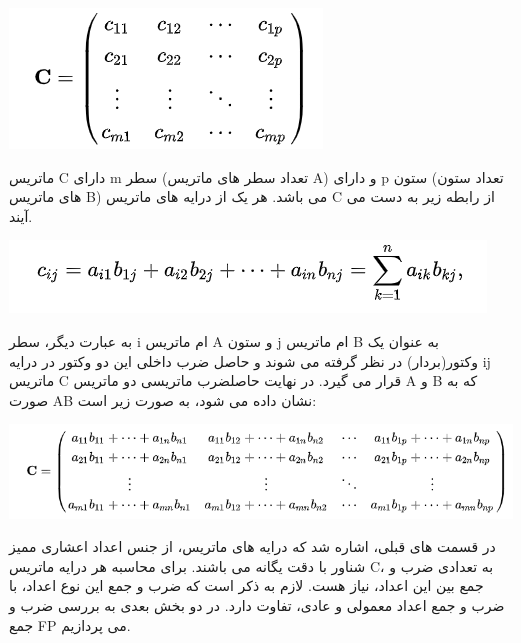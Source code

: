 \documentclass[12pt,titlepage,a4page , tikz , multi,table , svgnames,xcdraw]{article}
\begin{document}
\begin{center}
\includegraphics[scale=0.8]
    {Images/Introduction/mat_mult_2.png}\\
\end{center}

	ماتریس C دارای m سطر (تعداد سطر های ماتریس A) و دارای p  ستون (تعداد ستون های ماتریس B) می باشد. هر یک از درایه های ماتریس C از رابطه زیر به دست می آیند.

\begin{center}
\includegraphics[scale=0.8]
    {Images/Introduction/mat_mult_3.png}\\
\end{center}

	به عبارت دیگر، سطر i ام ماتریس A و ستون j ام ماتریس B به عنوان یک وکتور(بردار) در نظر گرفته می شوند و حاصل ضرب داخلی این دو وکتور در درایه ij ماتریس C قرار می گیرد. در نهایت حاصلضرب ماتریسی دو ماتریس A و B که به صورت AB نشان داده می شود، به صورت زیر است:

\begin{center}
\includegraphics[scale=0.6]
    {Images/Introduction/mat_mult_4.png}\\
\end{center}

در قسمت های قبلی، اشاره شد که درایه های ماتریس، از جنس اعداد اعشاری ممیز شناور با دقت یگانه می باشند. برای محاسبه هر درایه ماتریس C، به تعدادی ضرب و جمع بین این اعداد، نیاز هست. لازم به ذکر است که ضرب و جمع این نوع اعداد، با ضرب و جمع اعداد معمولی و عادی، تفاوت دارد. در دو بخش بعدی به بررسی ضرب و جمع FP می پردازیم.
\end{document}
